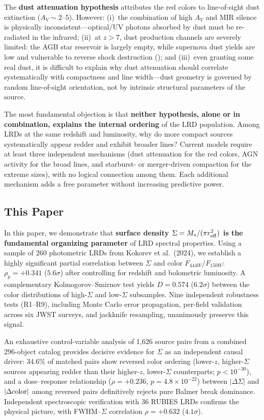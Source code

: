 \documentclass[apj,twocolumn,longbibliography,linenumbers]{aastex701}
\begin{document}
The \textbf{dust attenuation hypothesis} attributes the red colors to line-of-sight dust extinction ($A_V \sim 2$--$5$). However: (i)~the combination of high $A_V$ and MIR silence is physically inconsistent---optical/UV photons absorbed by dust must be re-radiated in the infrared; (ii)~at $z > 7$, dust production channels are severely limited: the AGB star reservoir is largely empty, while supernova dust yields are low and vulnerable to reverse shock destruction (\citealt{Gall2011}); and (iii)~even granting some real dust, it is difficult to explain why dust attenuation should correlate systematically with compactness and line width---dust geometry is governed by random line-of-sight orientation, not by intrinsic structural parameters of the source.

The most fundamental objection is that \textbf{neither hypothesis, alone or in combination, explains the internal ordering} of the LRD population. Among LRDs at the same redshift and luminosity, why do more compact sources systematically appear redder and exhibit broader lines? Current models require at least three independent mechanisms (dust attenuation for the red colors, AGN activity for the broad lines, and starburst- or merger-driven compaction for the extreme sizes), with no logical connection among them. Each additional mechanism adds a free parameter without increasing predictive power.

\subsection{This Paper}

In this paper, we demonstrate that \textbf{surface density $\Sigma = M_*/(\pi r_{\rm eff}^2)$ is the fundamental organizing parameter} of LRD spectral properties. Using a sample of 260 photometric LRDs from Kokorev et al.\ (2024), we establish a highly significant partial correlation between $\Sigma$ and color $F_{444W}/F_{150W}$: $\rho_p = +0.341$ ($5.6\sigma$) after controlling for redshift and bolometric luminosity. A complementary Kolmogorov--Smirnov test yields $D = 0.574$ ($6.2\sigma$) between the color distributions of high-$\Sigma$ and low-$\Sigma$ subsamples. Nine independent robustness tests (R1--R9), including Monte Carlo error propagation, per-field validation across six JWST surveys, and jackknife resampling, unanimously preserve this signal.

An exhaustive control-variable analysis of 1,626 source pairs from a combined 296-object catalog provides decisive evidence for $\Sigma$ as an independent causal driver: 34.6\% of matched pairs show reversed color ordering (lower-$z$, higher-$\Sigma$ sources appearing redder than their higher-$z$, lower-$\Sigma$ counterparts; $p < 10^{-30}$), and a dose--response relationship ($\rho = +0.236$, $p = 4.8 \times 10^{-22}$) between $|\Delta\Sigma|$ and $|\Delta{\rm color}|$ among reversed pairs definitively rejects pure Balmer break dominance. Independent spectroscopic verification with 36 RUBIES LRDs confirms the physical picture, with FWHM--$\Sigma$ correlation $\rho = +0.632$ ($4.1\sigma$).
\end{document}
